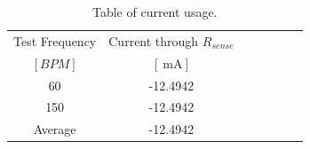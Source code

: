  \begin{table}[H]
        \centering
        \footnotesize
        \caption{Table of current usage.}
         \begin{tabular}{cc@{\qquad}rrrrr}
          \toprule
             Test Frequency & Current through $R_{sense}$ \\
             $[BPM]$ & $[\SI{}{\milli\ampere}]$ \\
          \midrule
             60 & -12.4942\\
             150 & -12.4942\\
          
          \bottomrule
          Average & -12.4942
        \end{tabular}
     \label{tab:current results}
\end{table}
 

